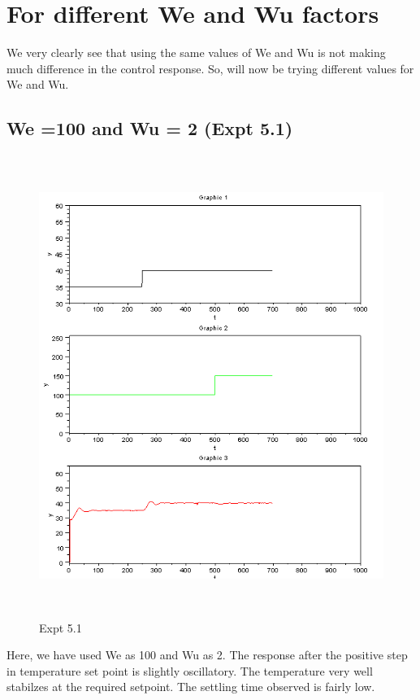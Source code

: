 \section{For different We and Wu factors}
We very clearly see that using the same values of We and Wu is not making much difference in the control response. So, will now be trying different values for We and Wu.
\subsection{We =100 and Wu = 2 (Expt 5.1) }
\begin{figure}[H]
  \includegraphics[width=12cm, height=15cm]{mpc/5_1.PNG}
  \caption{Expt 5.1}
\end{figure}
Here, we have used We as 100 and Wu as 2. The response after the positive step in temperature set point is slightly oscillatory. The temperature very well stabilzes at the required setpoint. The settling time observed is fairly low.

